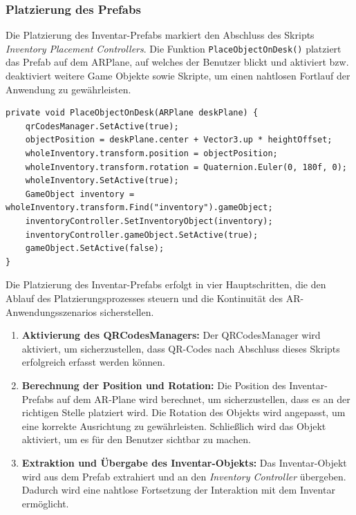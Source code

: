 \begin{itemize}
\subsubsection{Platzierung des Prefabs}
Die Platzierung des Inventar-Prefabs markiert den Abschluss des Skripts \textit{Inventory Placement Controllers}. Die
Funktion \texttt{PlaceObjectOnDesk()} platziert das Prefab auf dem ARPlane, auf welches der Benutzer blickt und aktiviert
bzw. deaktiviert weitere Game Objekte sowie Skripte, um einen nahtlosen Fortlauf der Anwendung zu gewährleisten.
\begin{lstlisting}[caption={Funktion zum Platzieren des Inventarobjekts}, label=code:placeObject]
    private void PlaceObjectOnDesk(ARPlane deskPlane) {
    qrCodesManager.SetActive(true);
    objectPosition = deskPlane.center + Vector3.up * heightOffset;
    wholeInventory.transform.position = objectPosition;
    wholeInventory.transform.rotation = Quaternion.Euler(0, 180f, 0);
    wholeInventory.SetActive(true);
    GameObject inventory = wholeInventory.transform.Find("inventory").gameObject;
    inventoryController.SetInventoryObject(inventory);
    inventoryController.gameObject.SetActive(true);
    gameObject.SetActive(false);
}
\end{lstlisting}

Die Platzierung des Inventar-Prefabs erfolgt in vier Hauptschritten, die den Ablauf des Platzierungsprozesses steuern
und die Kontinuität des AR-Anwendungsszenarios sicherstellen.

\begin{enumerate}
    \item \textbf{Aktivierung des QRCodesManagers:} Der QRCodesManager wird aktiviert, um sicherzustellen, dass QR-Codes
    nach Abschluss dieses Skripts erfolgreich erfasst werden können.

    \item \textbf{Berechnung der Position und Rotation:} Die Position des Inventar-Prefabs auf dem AR-Plane wird berechnet,
    um sicherzustellen, dass es an der richtigen Stelle platziert wird. Die Rotation des Objekts wird angepasst, um eine
    korrekte Ausrichtung zu gewährleisten. Schließlich wird das Objekt aktiviert, um es für den Benutzer sichtbar zu machen.

    \item \textbf{Extraktion und Übergabe des Inventar-Objekts:} Das Inventar-Objekt wird aus dem Prefab extrahiert und an
    den \textit{Inventory Controller} übergeben. Dadurch wird eine nahtlose Fortsetzung der Interaktion mit dem Inventar ermöglicht.


\end{enumerate}
\end{itemize}
